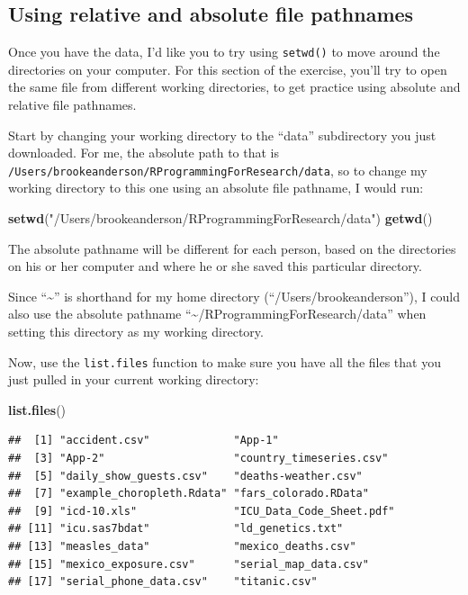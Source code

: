 \documentclass[]{book}
\makeatletter
\newenvironment{Shaded}{\begin{snugshade}}{\end{snugshade}}
\newcommand{\KeywordTok}[1]{\textcolor[rgb]{0.13,0.29,0.53}{\textbf{#1}}}
\newcommand{\StringTok}[1]{\textcolor[rgb]{0.31,0.60,0.02}{#1}}
\newcommand{\NormalTok}[1]{#1}
\newenvironment{kframe}{%
\medskip{}
\setlength{\fboxsep}{.8em}
 \def\at@end@of@kframe{}%
 \ifinner\ifhmode%
  \def\at@end@of@kframe{\end{minipage}}%
  \begin{minipage}{\columnwidth}%
 \fi\fi%
 \def\FrameCommand##1{\hskip\@totalleftmargin \hskip-\fboxsep
 \colorbox{shadecolor}{##1}\hskip-\fboxsep
     \hskip-\linewidth \hskip-\@totalleftmargin \hskip\columnwidth}%
 \MakeFramed {\advance\hsize-\width
   \@totalleftmargin\z@ \linewidth\hsize
   \@setminipage}}%
 {\par\unskip\endMakeFramed%
 \at@end@of@kframe}
\renewenvironment{Shaded}{\begin{kframe}}{\end{kframe}}
\newenvironment{rmdblock}[1]
  {
  \begin{itemize}
  \renewcommand{\labelitemi}{
    \raisebox{-.7\height}[0pt][0pt]{
      {\setkeys{Gin}{width=3em,keepaspectratio}\texttt{[image: images/\#1]}}
    }
  }
  \setlength{\fboxsep}{1em}
  \begin{kframe}
  \item
  }
  {
  \end{kframe}
  \end{itemize}
  }
\newenvironment{rmdnote}
  {\begin{rmdblock}{note}}
  {\end{rmdblock}}
\theoremstyle{definition}
\theoremstyle{definition}
\theoremstyle{definition}
\theoremstyle{remark}
\makeatother
\begin{document}
\subsection{Using relative and absolute file
pathnames}\label{using-relative-and-absolute-file-pathnames}

Once you have the data, I'd like you to try using \texttt{setwd()} to
move around the directories on your computer. For this section of the
exercise, you'll try to open the same file from different working
directories, to get practice using absolute and relative file pathnames.

Start by changing your working directory to the ``data'' subdirectory
you just downloaded. For me, the absolute path to that is
\texttt{/Users/brookeanderson/RProgrammingForResearch/data}, so to
change my working directory to this one using an absolute file pathname,
I would run:

\begin{Shaded}
\begin{Highlighting}[]
\KeywordTok{setwd}\NormalTok{(}\StringTok{"/Users/brookeanderson/RProgrammingForResearch/data"}\NormalTok{)}
\KeywordTok{getwd}\NormalTok{()}
\end{Highlighting}
\end{Shaded}

The absolute pathname will be different for each person, based on the
directories on his or her computer and where he or she saved this
particular directory.

\begin{rmdnote}
Since ``\textasciitilde{}'' is shorthand for my home directory
(``/Users/brookeanderson''), I could also use the absolute pathname
``\textasciitilde{}/RProgrammingForResearch/data'' when setting this
directory as my working directory.
\end{rmdnote}

Now, use the \texttt{list.files} function to make sure you have all the
files that you just pulled in your current working directory:

\begin{Shaded}
\begin{Highlighting}[]
\KeywordTok{list.files}\NormalTok{()}
\end{Highlighting}
\end{Shaded}

\begin{verbatim}
##  [1] "accident.csv"             "App-1"                   
##  [3] "App-2"                    "country_timeseries.csv"  
##  [5] "daily_show_guests.csv"    "deaths-weather.csv"      
##  [7] "example_choropleth.Rdata" "fars_colorado.RData"     
##  [9] "icd-10.xls"               "ICU_Data_Code_Sheet.pdf" 
## [11] "icu.sas7bdat"             "ld_genetics.txt"         
## [13] "measles_data"             "mexico_deaths.csv"       
## [15] "mexico_exposure.csv"      "serial_map_data.csv"     
## [17] "serial_phone_data.csv"    "titanic.csv"
\end{verbatim}
\end{document}
